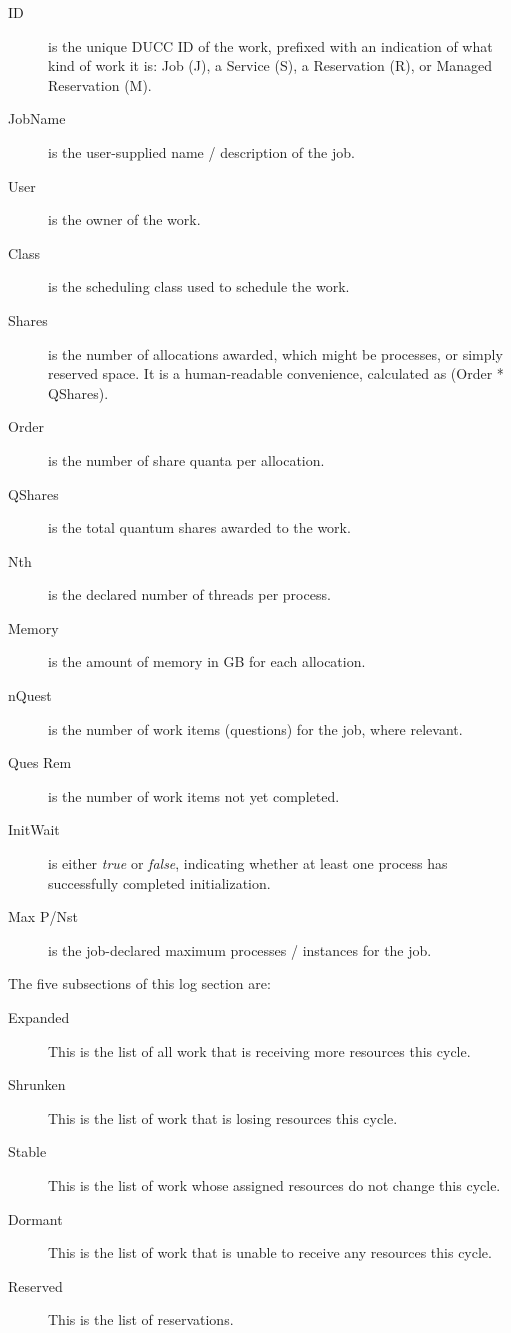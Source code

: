      \begin{description}
       \item[ID] is the unique DUCC ID of the work, prefixed with an indication of what kind of
         work it is: Job (J), a Service (S), a Reservation (R), or Managed Reservation (M).
       \item[JobName] is the user-supplied name / description of the job.
       \item[User] is the owner of the work.
       \item[Class] is the scheduling class used to schedule the work.
       \item[Shares] is the number of allocations awarded, which might be processes, or simply reserved space.  It
         is a human-readable convenience, calculated as (Order * QShares).
       \item[Order] is the number of share quanta per allocation.
       \item[QShares] is the total quantum shares awarded to the work.
       \item[Nth] is the declared number of threads per process.
       \item[Memory] is the amount of memory in GB for each allocation.
       \item[nQuest] is the number of work items (questions) for the job, where relevant.
       \item[Ques Rem] is the number of work items not yet completed.
       \item[InitWait] is either {\em true} or {\em false}, indicating whether at least one process
         has successfully completed initialization.
       \item[Max P/Nst] is the job-declared maximum processes / instances for the job.
     \end{description}

     The five subsections of this log section are:
     \begin{description}
       \item[Expanded] This is the list of all work that is receiving more resources this cycle.
       \item[Shrunken] This is the list of work that is losing resources this cycle.
       \item[Stable] This is the list of work whose assigned resources do not change this cycle.
       \item[Dormant] This is the list of work that is unable to receive any resources this cycle.
       \item[Reserved] This is the list of reservations.
     \end{description}


